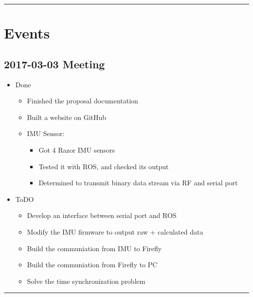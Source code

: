 \documentclass[letterpaper,12pt]{article}
\newcommand{\panhline}{\begin{center}\rule{\textwidth}{1pt}\end{center}}
\begin{document}
\panhline
\section{Events}

\subsection{2017-03-03 Meeting}

\begin{itemize}
	\item Done
	\begin{itemize}
		\item Finished the proposal documentation
		\item Built a website on GitHub
		\item IMU Sensor:
		\begin{itemize}
			\item Got 4 Razor IMU sensors
			\item Tested it with ROS, and checked its output
			\item Determined to transmit binary data stream via RF and serial port
		\end{itemize}
	\end{itemize}
	\item ToDO
	\begin{itemize}
		\item Develop an interface between serial port and ROS
		\item Modify the IMU firmware to output raw + calculated data
		\item Build the communiation from IMU to Firefly
		\item Build the communiation from Firefly to PC
		\item Solve the time synchronization problem		
	\end{itemize}
\end{itemize}

\panhline
\end{document}
